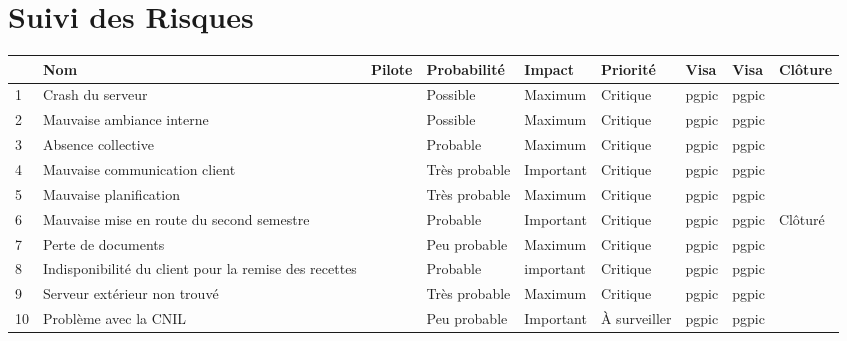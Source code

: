 \documentclass[asi]{picInsa}
\title{\PRO{}}
\author{\Pierre}
\begin{document}
\couverture{}

\informationsGenerales{}


\chapter*{Suivi des Risques}
\begin{longtable}{|p{0.3cm}|p{2.5cm}|p{2cm}|p{2cm}|p{1.8cm}|p{1.5cm}|p{1cm}|p{1cm}|p{1.5cm}|}
			\hline
			\rowcolor{gray!40}
			\No & Nom & Pilote & Probabilité & Impact & Priorité & Visa \RQCourt{} & Visa \CPCourt{} & Clôture \\\hline
			
			 1 & Crash du serveur & \Matthieu & Possible & Maximum & Critique & pgpic & pgpic & \\\hline
			 
			 2 & Mauvaise ambiance interne & \Pierre & Possible & Maximum & Critique & pgpic & pgpic & \\\hline
			 
			 3 & Absence collective & \Pierre & Probable & Maximum & Critique & pgpic & pgpic & \\\hline
			 
			 4 & Mauvaise communication client & \Julie & Très probable & Important & Critique & pgpic & pgpic & \\\hline
			 
			 5 & Mauvaise planification & \Florian & Très probable & Maximum & Critique & pgpic & pgpic & \\\hline
			 
			 6 & Mauvaise mise en route du second semestre & \Melissa & Probable & Important & Critique & pgpic & pgpic & Clôturé \\\hline
			 
			 7 & Perte de documents & \Melissa & Peu probable & Maximum & Critique & pgpic & pgpic & \\\hline
			 
			 8 & Indisponibilité du client pour la remise des recettes & \Julie & Probable & important & Critique & pgpic & pgpic & \\\hline
			 
			 9 & Serveur extérieur non trouvé & \Matthieu & Très probable & Maximum & Critique & pgpic & pgpic & \\\hline
			 
			 10 & Problème avec la CNIL & \Pierre & Peu probable & Important & À surveiller & pgpic & pgpic & \\\hline
			 

\end{longtable}
\end{document}
